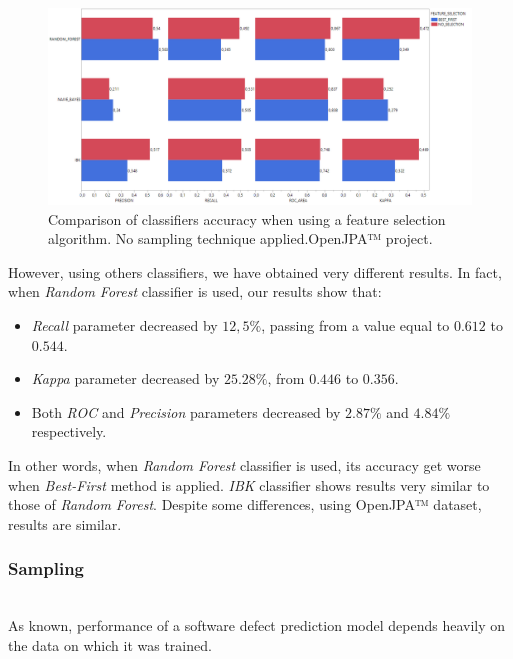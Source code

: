 \documentclass[sigconf]{acmart}
\begin{document}
\begin{figure}[h!]
  \centering
  \includegraphics[width=\textwidth]{./OPENJPA/FeatureSelection.png}
  \caption{Comparison of classifiers accuracy when using a feature selection algorithm. No sampling technique applied.\newline OpenJPA™ project. \newline}
  \label{OPENJPA-FeatureSelection}
\end{figure}

However, using others classifiers, we have obtained very different results. In fact, when \textit{Random Forest} classifier is used, our results show that: 

\begin{itemize}
\item \textit{Recall} parameter decreased by $12,5\%$, passing from a value equal to $0.612$ to $0.544$. 
\item \textit{Kappa} parameter decreased by $25.28\%$, from $0.446$ to $0.356$. 
\item Both \textit{ROC} and \textit{Precision} parameters decreased by $2.87\%$ and $4.84\%$ respectively.
\end{itemize}

In other words, when \textit{Random Forest} classifier is used, its accuracy get worse when \textit{Best-First} method is applied. \textit{IBK} classifier shows results very similar to those of \textit{Random Forest}. Despite some differences, using OpenJPA™ dataset, results are similar. 

\FloatBarrier

\subsubsection{Sampling}
\hfill\\

As known, performance of a software defect prediction model depends heavily on the data on which it was trained.
\end{document}
